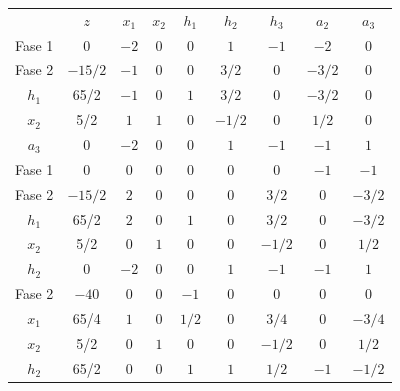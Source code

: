 \begin{center}
\begin{tabular}{c|c|ccccccc|}
 & $z$ & $x_1$ & $x_2$ & $h_1$ & $h_2$ & $h_3$ & $a_2$ & $a_3$\\ 
Fase 1 & $0$ & $-2$ & $0$ & $0$ & $1$ & $-1$ & $-2$ & $0$ \\
Fase 2 & $-15/2$ & $-1$ & $0$ & $0$ & $3/2$ & $0$ & $-3/2$ & $0$ \\
\hline
$h_1$ & 65/2  & $-1$ & $0$ & $1$ & $3/2$ & $0$ & $-3/2$ & $0$\\
$x_2$ & 5/2  & $1$ & $1$ & $0$ & $-1/2$ & $0$ & $1/2$ & $0$\\
$a_3$ & 0  & $-2$ & $0$ & $0$ & $1$ & $-1$ & $-1$ & $1$\\
\hline
Fase 1 & $0$ & $0$ & $0$ & $0$ & $0$ & $0$ & $-1$ & $-1$ \\
Fase 2 & $-15/2$ & $2$ & $0$ & $0$ & $0$ & $3/2$ & $0$ & $-3/2$ \\
\hline
$h_1$ & 65/2  & $2$ & $0$ & $1$ & $0$ & $3/2$ & $0$ & $-3/2$\\
$x_2$ & 5/2  & $0$ & $1$ & $0$ & $0$ & $-1/2$ & $0$ & $1/2$\\
$h_2$ & 0  & $-2$ & $0$ & $0$ & $1$ & $-1$ & $-1$ & $1$\\
\hline
Fase 2 & $-40$ & $0$ & $0$ & $-1$ & $0$ & $0$ & $0$ & $0$ \\
\hline
$x_1$ & 65/4  & $1$ & $0$ & $1/2$ & $0$ & $3/4$ & $0$ & $-3/4$\\
$x_2$ & 5/2  & $0$ & $1$ & $0$ & $0$ & $-1/2$ & $0$ & $1/2$\\
$h_2$ & 65/2  & $0$ & $0$ & $1$ & $1$ & $1/2$ & $-1$ & $-1/2$\\
\hline
\end{tabular}
\end{center}